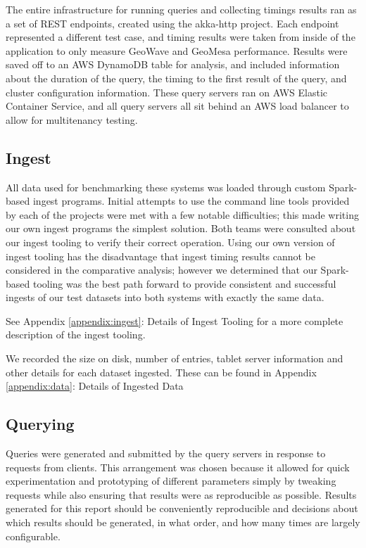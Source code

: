 The entire infrastructure for running queries and collecting timings results ran as a set of REST endpoints, created using the akka-http project.
Each endpoint represented a different test case, and timing results were taken from inside of the application to only measure GeoWave and GeoMesa performance.
Results were saved off to an AWS DynamoDB table for analysis, and included information about the duration of the query, the timing to the first result of the query, and cluster configuration information.
These query servers ran on AWS Elastic Container Service, and all query servers all sit behind an AWS load balancer to allow for multitenancy testing.


\subsection{Ingest}
\label{sec:performance:ingest}

All data used for benchmarking these systems was loaded through custom Spark-based ingest programs.
Initial attempts to use the command line tools provided by each of the projects were met with a few notable difficulties; this made writing our own ingest programs the simplest solution.
Both teams were consulted about our ingest tooling to verify their correct operation.
Using our own version of ingest tooling has the disadvantage that ingest timing results cannot be considered in the comparative analysis; however we determined that our Spark-based tooling was the best path forward to provide consistent and successful ingests of our test datasets into both systems with exactly the same data.

See Appendix \ref{appendix:ingest}: Details of Ingest Tooling for a more complete description of the ingest tooling.

We recorded the size on disk, number of entries, tablet server information and other details for each dataset ingested.
These can be found in Appendix \ref{appendix:data}: Details of Ingested Data


\subsection{Querying}
\label{sec:performance:querying}

Queries were generated and submitted by the query servers in response to requests from clients.
This arrangement was chosen because it allowed for quick experimentation and prototyping of different parameters simply by tweaking requests while also ensuring that results were as reproducible as possible. Results generated for this report should be conveniently reproducible and decisions about which results should be generated, in what order, and how many times are largely configurable.

